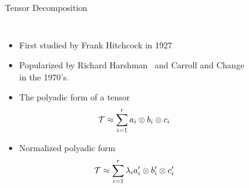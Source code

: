 \documentclass[handout]{beamer}
\begin{document}
\begin{frame}{Tensor Decomposition}
\begin{columns}

  \begin{itemize}[<+->]
      \small
\item First studied by Frank Hitchcock in 1927~\cite{hitchcock1927}
\item Popularized by Richard Harshman~\cite{harshman1970} and Carroll
  and Change~\cite{carroll1970} in the 1970's.
\item The polyadic form of a tensor
  \[
      \mathcal{T} \approx \displaystyle\sum_{i=1}^{r} a_i \otimes b_i
  \otimes c_i
\]
\item Normalized polyadic form
  \[
      \mathcal{T} \approx \displaystyle\sum_{i=1}^{r} \lambda_i a'_i
  \otimes b'_i \otimes c'_i
  \]
\end{itemize}
\begin{figure}
  \centering
\end{figure}
\end{columns}
\end{frame}
\end{document}
